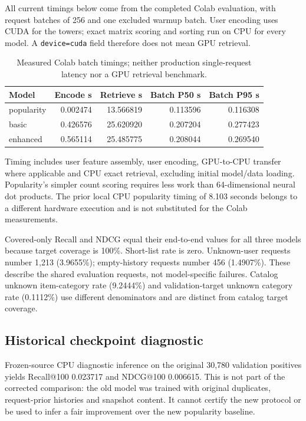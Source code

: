 \documentclass[11pt,a4paper]{article}
\begin{document}
All current timings below come from the completed Colab evaluation, with request batches of 256 and one excluded warmup batch. User encoding uses CUDA for the towers; exact matrix scoring and sorting run on CPU for every model. A \texttt{device=cuda} field therefore does not mean GPU retrieval.
\begin{table}[H]\centering\small\begin{tabular}{lrrrr}\toprule
Model & Encode s & Retrieve s & Batch P50 s & Batch P95 s\\\midrule
popularity & 0.002474 & 13.566819 & 0.113596 & 0.116308 \\
basic & 0.426576 & 25.620920 & 0.207204 & 0.277423 \\
enhanced & 0.565114 & 25.485775 & 0.208044 & 0.269540 \\
\bottomrule\end{tabular}\caption{Measured Colab batch timings; neither production single-request latency nor a GPU retrieval benchmark.}\end{table}
Timing includes user feature assembly, user encoding, GPU-to-CPU transfer where applicable and CPU exact retrieval, excluding initial model/data loading. Popularity's simpler count scoring requires less work than 64-dimensional neural dot products. The prior local CPU popularity timing of 8.103 seconds belongs to a different hardware execution and is not substituted for the Colab measurements.

Covered-only Recall and NDCG equal their end-to-end values for all three models because target coverage is 100\%. Short-list rate is zero. Unknown-user requests number 1,213 (3.9655\%); empty-history requests number 456 (1.4907\%). These describe the shared evaluation requests, not model-specific failures. Catalog unknown item-category rate (9.2444\%) and validation-target unknown category rate (0.1112\%) use different denominators and are distinct from catalog target coverage.

\subsection{Historical checkpoint diagnostic}
Frozen-source CPU diagnostic inference on the original 30,780 validation positives yields Recall@100 0.023717 and NDCG@100 0.006615. This is not part of the corrected comparison: the old model was trained with original duplicates, request-prior histories and snapshot content. It cannot certify the new protocol or be used to infer a fair improvement over the new popularity baseline.
\end{document}
